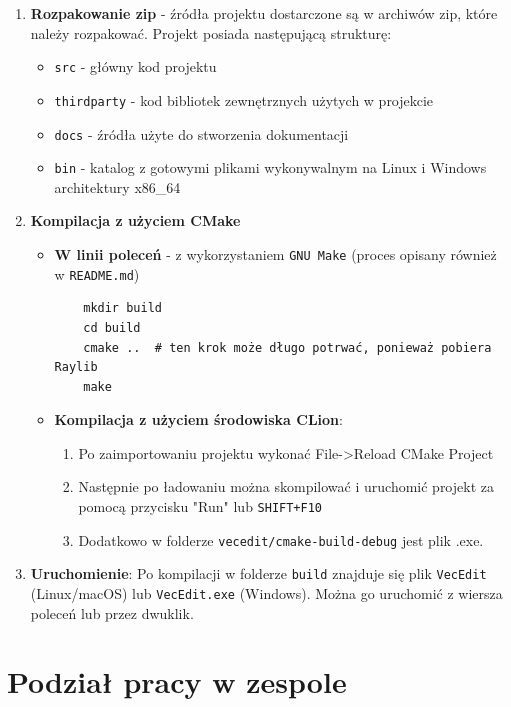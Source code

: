 \documentclass[a4paper,12pt]{article}
\begin{document}
\begin{enumerate}
    \item \textbf{Rozpakowanie zip} - źródła projektu dostarczone są w archiwów zip, które należy rozpakować. Projekt posiada następującą strukturę:
    \begin{itemize}
      \item \texttt{src} - główny kod projektu
      \item \texttt{thirdparty} - kod bibliotek zewnętrznych użytych w projekcie
      \item \texttt{docs} - źródła użyte do stworzenia dokumentacji
      \item \texttt{bin} - katalog z gotowymi plikami wykonywalnym na Linux i Windows architektury x86\_64
    \end{itemize}
    \item \textbf{Kompilacja z użyciem CMake}
    \begin{itemize}
      \item  \textbf{W linii poleceń} - z wykorzystaniem \texttt{GNU Make} (proces opisany również w \texttt{README.md})
    \begin{verbatim}
    mkdir build
    cd build
    cmake ..  # ten krok może długo potrwać, ponieważ pobiera Raylib
    make
    \end{verbatim}
    \item \textbf{Kompilacja z użyciem środowiska CLion}:
        \begin{enumerate}
            \item Po zaimportowaniu projektu wykonać File->Reload CMake Project
            \item Następnie po ładowaniu można skompilować i uruchomić projekt za pomocą 
                przycisku "Run" lub \texttt{SHIFT+F10}
            \item Dodatkowo w folderze \texttt{vecedit/cmake-build-debug} jest
                plik .exe.
        \end{enumerate}
    \end{itemize}
    \item \textbf{Uruchomienie}: Po kompilacji w folderze \texttt{build} znajduje się 
    plik \texttt{VecEdit} (Linux/macOS) lub \texttt{VecEdit.exe} (Windows). 
    Można go uruchomić z wiersza poleceń lub przez dwuklik. 
\end{enumerate}

\section{Podział pracy w zespole}
\end{document}
